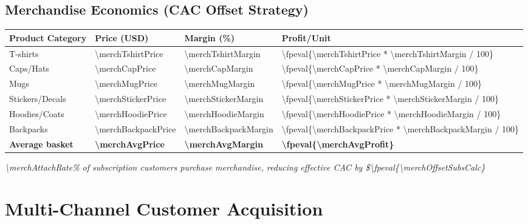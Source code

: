 \documentclass[11pt]{article}
\newcommand{\numfpeval}[1]{\num{\fpeval{#1}}}
\begin{document}
\subsection{Merchandise Economics (CAC Offset Strategy)}
\begin{table}[H]
\centering
\begin{tabularx}{\linewidth}{l Y Y Y}
\toprule
Product Category & Price (USD) & Margin (\%)\cite{printful2023} & Profit/Unit \\\midrule
T-shirts & \num{\merchTshirtPrice} & \num{\merchTshirtMargin} & \numfpeval{\merchTshirtPrice * \merchTshirtMargin / 100} \\
Caps/Hats & \num{\merchCapPrice} & \num{\merchCapMargin} & \numfpeval{\merchCapPrice * \merchCapMargin / 100} \\
Mugs & \num{\merchMugPrice} & \num{\merchMugMargin} & \numfpeval{\merchMugPrice * \merchMugMargin / 100} \\
Stickers/Decals & \num{\merchStickerPrice} & \num{\merchStickerMargin} & \numfpeval{\merchStickerPrice * \merchStickerMargin / 100} \\
Hoodies/Coats & \num{\merchHoodiePrice} & \num{\merchHoodieMargin} & \numfpeval{\merchHoodiePrice * \merchHoodieMargin / 100} \\
Backpacks & \num{\merchBackpackPrice} & \num{\merchBackpackMargin} & \numfpeval{\merchBackpackPrice * \merchBackpackMargin / 100} \\\midrule
\textbf{Average basket} & \textbf{\num{\merchAvgPrice}} & \textbf{\num{\merchAvgMargin}} & \textbf{\numfpeval{\merchAvgProfit}} \\
\bottomrule
\end{tabularx}
\end{table}
\textit{\num{\merchAttachRate}\% of subscription customers purchase merchandise, reducing effective CAC by \$\numfpeval{\merchOffsetSubsCalc}}\cite{shopify2024}

\section{Multi-Channel Customer Acquisition}
\end{document}
